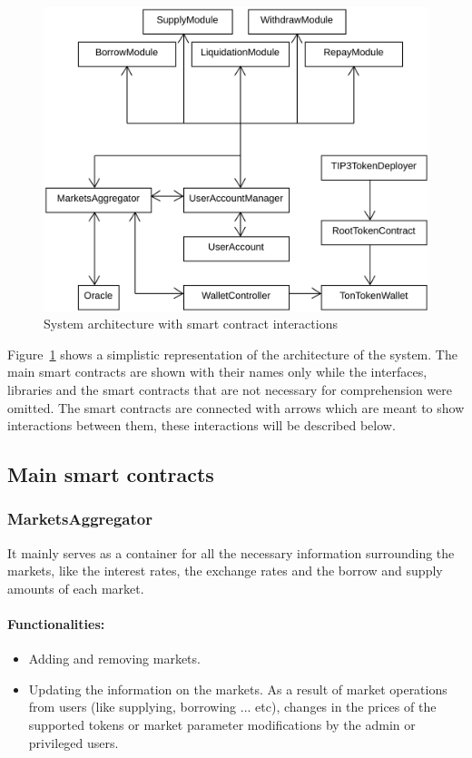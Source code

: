 \begin{figure}[h!]
  \includegraphics[width=\textwidth]{./assets/archi.png}
  \caption[]{System architecture with smart contract interactions}
  \label{fig:archi}
\end{figure}

Figure~\ref{fig:archi} shows a simplistic representation of the architecture of the system. The main smart contracts are shown with their names only while the interfaces, libraries and the smart contracts that are not necessary for comprehension were omitted. The smart contracts are connected with arrows which are meant to show interactions between them, these interactions will be described below.

\subsection{Main smart contracts}

\subsubsection{MarketsAggregator}

It mainly serves as a container for all the necessary information surrounding the markets, like the interest rates, the exchange rates and the borrow and supply amounts of each market.

\paragraph*{Functionalities:}
\begin{itemize}
  \item Adding and removing markets.
  \item Updating the information on the markets. As a result of market operations from users (like supplying, borrowing ... etc), changes in the prices of the supported tokens or market parameter modifications by the admin or privileged users.
\end{itemize}

